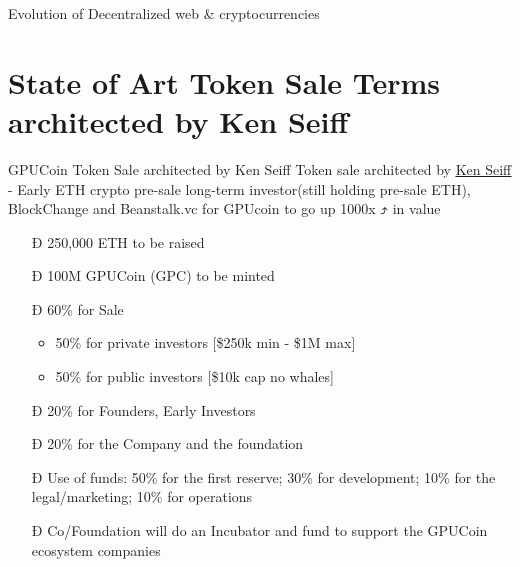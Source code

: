 \documentclass[10pt]{beamer}
\begin{document}
\begin{frame}[t]{Evolution of Decentralized web \& cryptocurrencies}
 
\end{frame} 
\section{State of Art Token Sale Terms architected by Ken Seiff}
\begin{frame}[fragile]{GPUCoin Token Sale architected by Ken Seiff}
Token sale architected by  \href{https://beanstalk.vc/}{\underline{Ken Seiff}} - Early ETH crypto pre-sale long-term investor(still holding pre-sale ETH), BlockChange and Beanstalk.vc for GPUcoin to go up 1000x ⤴ in value


 \begin{itemize}[<+-| alert@+>]%

\item[Ð]{250,000 ETH to be raised}
\item[Ð]100M GPUCoin (GPC) to be minted
\item[Ð]60\% for Sale
\begin{itemize}[<+-| alert@+>]
\item 50\% for private investors [\$250k min - \$1M max]
\item 50\% for public investors [\$10k cap no whales]
\end{itemize}
\item[Ð]{20\% for Founders, Early Investors}
\item[Ð]{20\% for the Company and the foundation}
\item[Ð]{Use of funds: 50\% for the first reserve; 30\% for development; 10\% for the legal/marketing; 10\% for operations}
\item[Ð]{Co/Foundation will do an Incubator and fund to support the GPUCoin ecosystem companies}
\end{itemize}

\end{frame}
\end{document}
